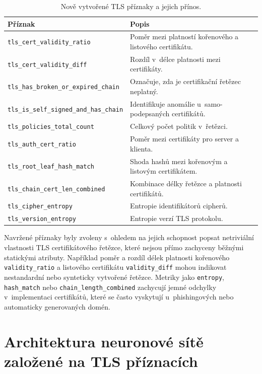 \begin{table}[H]
\centering
\begin{tabular}{|l|p{7.8cm}|}
\hline
\textbf{Příznak} & \textbf{Popis} \\
\hline
\texttt{tls\_cert\_validity\_ratio} & Poměr mezi platností kořenového a listového certifikátu. \\
\texttt{tls\_cert\_validity\_diff} & Rozdíl v~délce platnosti mezi certifikáty. \\
\texttt{tls\_has\_broken\_or\_expired\_chain} & Označuje, zda je certifikační řetězec neplatný. \\
\texttt{tls\_is\_self\_signed\_and\_has\_chain} & Identifikuje anomálie u~samo-podepsaných certifikátů. \\
\texttt{tls\_policies\_total\_count} & Celkový počet politik v~řetězci. \\
\texttt{tls\_auth\_cert\_ratio} & Poměr mezi certifikáty pro server a klienta. \\
\texttt{tls\_root\_leaf\_hash\_match} & Shoda hashů mezi kořenovým a listovým certifikátem. \\
\texttt{tls\_chain\_cert\_len\_combined} & Kombinace délky řetězce a platnosti certifikátů. \\
\texttt{tls\_cipher\_entropy} & Entropie identifikátorů cipherů. \\
\texttt{tls\_version\_entropy} & Entropie verzí TLS protokolu. \\
\hline
\end{tabular}
\caption{Nově vytvořené TLS příznaky a jejich přínos.}
\label{tab:new_tls_features}
\end{table}

Navržené příznaky byly zvoleny s~ohledem na jejich schopnost popsat netriviální vlastnosti TLS certifikátového řetězce, které nejsou přímo zachyceny běžnými statickými atributy. Například poměr a rozdíl délek platnosti kořenového \texttt{validity\_ratio} a listového certifikátu \texttt{validity\_diff} mohou indikovat nestandardní nebo synteticky vytvořené řetězce. Metriky jako \texttt{entropy}, \texttt{hash\_match} nebo \texttt{chain\_length\_combined} zachycují jemné odchylky v~implementaci certifikátů, které se často vyskytují u~phishingových nebo automaticky generovaných domén. 


\section*{Architektura neuronové sítě založené na TLS příznacích}
\label{appendix:tls-network-architecture}

